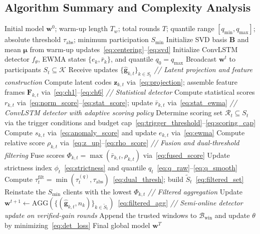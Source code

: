 \documentclass[journal]{IEEEtran}
\begin{document}
\subsection{Algorithm Summary and Complexity Analysis}
\label{sec:complexity}

\begin{algorithm}[t]
\caption{CER-FedAvg: ConvLSTM-EWMA Robust FedAvg at the BS}
\label{alg:cer_fedavg}
\begin{algorithmic}[1]
\REQUIRE Initial model $\mathbf{w}^{0}$; warm-up length $T_w$; total rounds $T$; quantile range $[q_{\min},q_{\max}]$; absolute threshold $\tau_{\mathrm{abs}}$; minimum participation $S_{\min}$
\STATE Initialize SVD basis $\mathbf{B}$ and mean $\boldsymbol{\mu}$ from warm-up updates~\eqref{eq:centering}--\eqref{eq:svd}
\STATE Initialize ConvLSTM detector $f_\theta$, EWMA states $\{e_{k},\bar r_{k}\}$, and quantile $q_{0}\!=\!q_{\max}$
    \STATE Broadcast $\mathbf{w}^{t}$ to participants $S_t \subseteq \mathcal{K}$
    \STATE Receive updates $\{\hat{\mathbf{g}}_{k,t}\}_{k\in S_t}$
    \STATE \textit{// Latent projection and feature construction}
    \STATE Compute latent codes $\mathbf{z}_{k,t}$ via~\eqref{eq:projection}; assemble feature frames $\mathbf{F}_{k,t}$ via~\eqref{eq:ch1}--\eqref{eq:ch6}
    \STATE \textit{// Statistical detector}
    \STATE Compute statistical scores $r_{k,t}$ via~\eqref{eq:norm_score}--\eqref{eq:stat_score}; update $\bar r_{k,t}$ via~\eqref{eq:stat_ewma}
    \STATE \textit{// ConvLSTM detector with adaptive scoring policy}
    \STATE Determine scoring set $\mathcal{R}_t \subseteq S_t$ via the trigger conditions and budget cap~\eqref{eq:trigger_threshold}--\eqref{eq:scoring_cap}
        \STATE Compute $s_{k,t}$ via~\eqref{eq:anomaly_score} and update $e_{k,t}$ via~\eqref{eq:ewma}
    \ENDFOR
    \STATE Compute relative score $\rho_{k,t}$ via~\eqref{eq:z_up}--\eqref{eq:rho_score}
    \STATE \textit{// Fusion and dual-threshold filtering}
    \STATE Fuse scores $\Phi_{k,t} \!=\! \max(\bar r_{k,t}, \rho_{k,t})$ via~\eqref{eq:fused_score}
    \STATE Update strictness index $\phi_t$~\eqref{eq:strictness} and quantile $q_t$~\eqref{eq:q_raw}--\eqref{eq:q_smooth}
    \STATE Compute $\tau_t^{\mathrm{filt}} = \min(\tau_t^{(q)}, \tau_{\mathrm{abs}})$~\eqref{eq:dual_thresh}; build $\widetilde{S}_t$~\eqref{eq:filtered_set}
        \STATE Reinstate the $S_{\min}$ clients with the lowest $\Phi_{k,t}$
    \ENDIF
    \STATE \textit{// Filtered aggregation}
    \STATE Update $\mathbf{w}^{t+1} \!\leftarrow\! \text{AGG}(\{(\hat{\mathbf{g}}_{k,t},n_k)\}_{k\in\widetilde{S}_t})$~\eqref{eq:filtered_agg}
    \STATE \textit{// Semi-online detector update on verified-gain rounds}
        \STATE Append the trusted windows to $\mathcal{B}_{\mathrm{win}}$ and update $\theta$ by minimizing~\eqref{eq:det_loss}
    \ENDIF
\ENDFOR
\RETURN Final global model $\mathbf{w}^{T}$
\end{algorithmic}
\end{algorithm}
\end{document}
